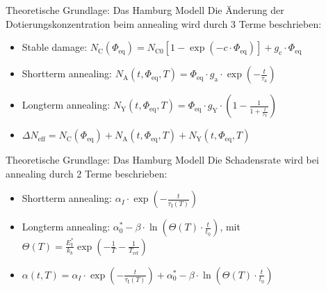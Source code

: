\documentclass[aspectratio=1610, 9pt]{beamer}
\begin{document}
\begin{frame}{Theoretische Grundlage: Das Hamburg Modell}
  Die Änderung der Dotierungskonzentration beim annealing wird durch 3 Terme beschrieben:
  \medskip
  \begin{itemize}
    \item Stable damage:\: $N_{\mathrm{C}}(\Phi_{\mathrm{eq}}) = N_{\mathrm{C0}}[1-\exp{(-c \cdot \Phi_{\mathrm{eq}})}] + g_{\mathrm{c}} \cdot \Phi_{\mathrm{eq}}$
    \medskip
    \item Shortterm annealing:\: $N_{\mathrm{A}}(t, \Phi_{\mathrm{eq}}, T)= \Phi_{\mathrm{eq}} \cdot g_{\mathrm{a}} \cdot \exp{(-\frac{t}{\tau_{\mathrm{a}}})}$
    \medskip
    \item Longterm annealing:\: $N_{\mathrm{Y}}(t, \Phi_{\mathrm{eq}}, T)= \Phi_{\mathrm{eq}} \cdot g_{\mathrm{Y}} \cdot \left(1-\frac{1}{1+\frac{t}{\tau_{\mathrm{Y}}}}\right)$
    \medskip
    \item   $\Delta N_{\mathrm{eff}} = N_{\mathrm{C}}(\Phi_{\mathrm{eq}}) + N_{\mathrm{A}}(t, \Phi_{\mathrm{eq}}, T) + N_{\mathrm{Y}}(t, \Phi_{\mathrm{eq}}, T)$
  \end{itemize}
\end{frame}

\begin{frame}{Theoretische Grundlage: Das Hamburg Modell}
  Die Schadensrate wird bei annealing durch 2 Terme beschrieben:
  \medskip
  \begin{itemize}
    \item Shortterm annealing:\: $\alpha_I \cdot \exp{\left(-\frac{t}{\tau_{\mathrm{I}}(T)}\right)}$
    \medskip
    \item Longterm annealing:\: $\alpha_{\mathrm{0}}^{*} -\beta \cdot \ln{\left(\Theta(T) \cdot \frac{t}{t_{\mathrm{0}}}\right)}$, \:\:\: mit \: $\Theta(T) = \frac{E_{\mathrm{I}}^*}{k_b} \exp{\left(-\frac{1}{T}-\frac{1}{T_{\mathrm{ref}}}\right)}$
    \medskip
    \item $\alpha(t, T) = \alpha_I \cdot \exp{\left(-\frac{t}{\tau_{\mathrm{I}}(T)}\right)} + \alpha_{\mathrm{0}}^{*} -\beta \cdot \ln{\left(\Theta(T) \cdot \frac{t}{t_{\mathrm{0}}}\right)}$
  \end{itemize}
  \medskip

\end{frame}
\end{document}
